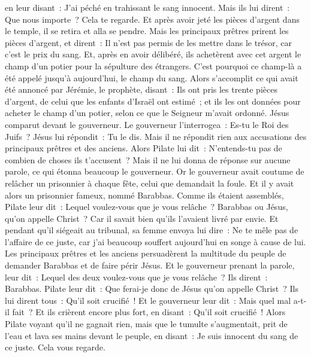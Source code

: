 \begin{multicols}{2}
en leur disant~: J'ai péché en trahissant le sang innocent. Mais ils lui dirent~: Que nous importe~? Cela te regarde.
Et après avoir jeté les pièces d'argent dans le temple, il se retira et alla se pendre.
Mais les principaux prêtres prirent les pièces d'argent, et dirent~: Il n'est pas permis de les mettre dans le trésor, car c'est le prix du sang.
Et, après en avoir délibéré, ils achetèrent avec cet argent le champ d'un potier pour la sépulture des étrangers.
C'est pourquoi ce champ-là a été appelé jusqu'à aujourd'hui, le champ du sang.
Alors s'accomplit ce qui avait été annoncé par Jérémie, le prophète, disant~: Ils ont pris les trente pièces d'argent, de celui que les enfants d'Israël ont estimé~;
et ils les ont données pour acheter le champ d'un potier, selon ce que le Seigneur m'avait ordonné.
Jésus comparut devant le gouverneur. Le gouverneur l'interrogea~: Es-tu le Roi des Juifs~? Jésus lui répondit~: Tu le dis.
Mais il ne répondit rien aux accusations des principaux prêtres et des anciens.
Alors Pilate lui dit~: N'entends-tu pas de combien de choses ils t'accusent~?
Mais il ne lui donna de réponse sur aucune parole, ce qui étonna beaucoup le gouverneur.
Or le gouverneur avait coutume de relâcher un prisonnier à chaque fête, celui que demandait la foule.
Et il y avait alors un prisonnier fameux, nommé Barabbas.
Comme ils étaient assemblés, Pilate leur dit~: Lequel voulez-vous que je vous relâche~? Barabbas ou Jésus, qu'on appelle Christ~?
Car il savait bien qu'ils l'avaient livré par envie.
Et pendant qu'il siégeait au tribunal, sa femme envoya lui dire~: Ne te mêle pas de l'affaire de ce juste, car j'ai beaucoup souffert aujourd'hui en songe à cause de lui.
Les principaux prêtres et les anciens persuadèrent la multitude du peuple de demander Barabbas et de faire périr Jésus.
Et le gouverneur prenant la parole, leur dit~: Lequel des deux voulez-vous que je vous relâche~? Ils dirent~: Barabbas.
Pilate leur dit~: Que ferai-je donc de Jésus qu'on appelle Christ~? Ils lui dirent tous~: Qu'il soit crucifié~!
Et le gouverneur leur dit~: Mais quel mal a-t-il fait~? Et ils crièrent encore plus fort, en disant~: Qu'il soit crucifié~!
Alors Pilate voyant qu'il ne gagnait rien, mais que le tumulte s'augmentait, prit de l'eau et lava ses mains devant le peuple, en disant~: Je suis innocent du sang de ce juste. Cela vous regarde.

\end{multicols}
